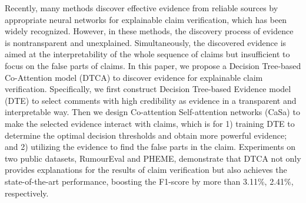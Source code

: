 Recently, many methods discover effective evidence from reliable sources by appropriate neural networks for explainable claim verification, which has been widely recognized. However, in these methods, the discovery process of evidence is nontransparent and unexplained. Simultaneously, the discovered evidence is aimed at the interpretability of the whole sequence of claims but insufficient to focus on the false parts of claims. In this paper, we propose a Decision Tree-based Co-Attention model (DTCA) to discover evidence for explainable claim verification. Specifically, we first construct Decision Tree-based Evidence model (DTE) to select comments with high credibility as evidence in a transparent and interpretable way. Then we design Co-attention Self-attention networks (CaSa) to make the selected evidence interact with claims, which is for 1) training DTE to determine the optimal decision thresholds and obtain more powerful evidence; and 2) utilizing the evidence to find the false parts in the claim. Experiments on two public datasets, RumourEval and PHEME, demonstrate that DTCA not only provides explanations for the results of claim verification but also achieves the state-of-the-art performance, boosting the F1-score by more than 3.11\%, 2.41\%, respectively.
